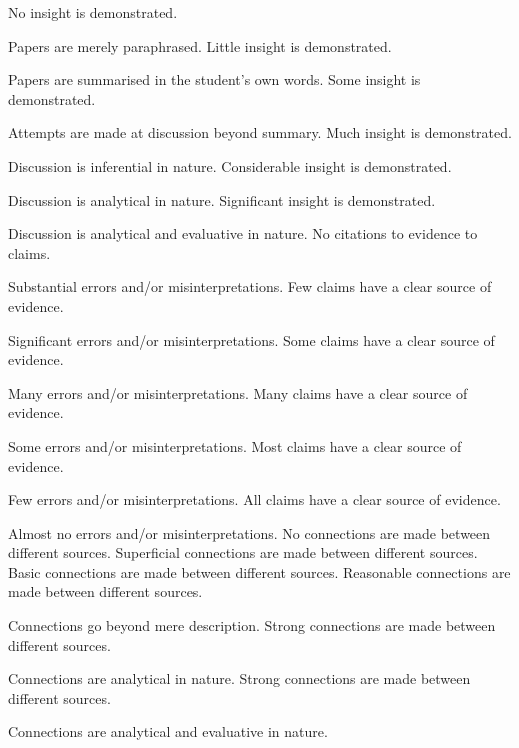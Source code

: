 \documentclass{../fal_assignment}
\begin{document}
\begin{markingrubric}
        \grade\fail No insight is demonstrated.
        \par		Papers are merely paraphrased.
        \grade		Little insight is demonstrated.
        \par		Papers are summarised in the student's own words.
        \grade		Some insight is demonstrated.
        \par		Attempts are made at discussion beyond summary.
        \grade		Much insight is demonstrated.
        \par		Discussion is inferential in nature.
        \grade		Considerable insight is demonstrated.
        \par		Discussion is analytical in nature.
        \grade		Significant insight is demonstrated.
        \par		Discussion is analytical and evaluative in nature.
%
        \grade\fail 	No citations to evidence to claims.
        \par 		Substantial errors and/or misinterpretations.
        \grade 		Few claims have a clear source of evidence.
        \par 		Significant errors and/or misinterpretations.
        \grade 		Some claims have a clear source of evidence.
        \par 		Many errors and/or misinterpretations.
        \grade 		Many claims have a clear source of evidence.
        \par 		Some errors and/or misinterpretations.
        \grade 		Most claims have a clear source of evidence.
        \par 		Few errors and/or misinterpretations.
        \grade 		All claims have a clear source of evidence.
        \par 		Almost no errors and/or misinterpretations.
%
        \grade\fail No connections are made between different sources.
        \grade		Superficial connections are made between different sources.
        \grade		Basic connections are made between different sources.
        \grade		Reasonable connections are made between different sources.
        \par		Connections go beyond mere description.
        \grade		Strong connections are made between different sources.
        \par		Connections are analytical in nature.
        \grade		Strong connections are made between different sources.
        \par		Connections are analytical and evaluative in nature.

\end{markingrubric}
\end{document}
